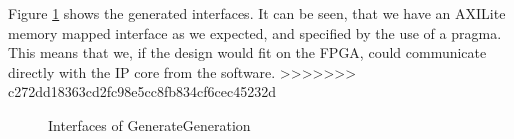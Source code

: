 Figure \ref{fig:siminterface} shows the generated interfaces. It can be seen, that we have an AXILite memory mapped interface as we expected, and specified by the use of a pragma. This means that we, if the design would fit on the FPGA, could communicate directly with the IP core from the software.
>>>>>>> c272dd18363cd2fc98e5cc8fb834cf6cec45232d

\begin{figure}[h!]
	\centering
	\caption{Interfaces of GenerateGeneration}
	\label{fig:siminterface}
\end{figure}

